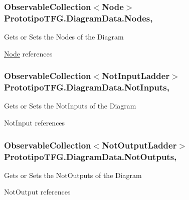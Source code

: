 \subsubsection[{Nodes}]{\setlength{\rightskip}{0pt plus 5cm}Observable\+Collection$<${\bf Node}$>$ Prototipo\+T\+F\+G.\+Diagram\+Data.\+Nodes\hspace{0.3cm}{\ttfamily [get]}, {\ttfamily [set]}}\label{class_prototipo_t_f_g_1_1_diagram_data_a38c2bb132b0998e9794dc8cd43e80784}


Gets or Sets the Nodes of the Diagram 

\hyperlink{class_prototipo_t_f_g_1_1_node}{Node} references\hypertarget{class_prototipo_t_f_g_1_1_diagram_data_a2822d1875199aa27bddc54e4ed7929d3}{}
\subsubsection[{Not\+Inputs}]{\setlength{\rightskip}{0pt plus 5cm}Observable\+Collection$<${\bf Not\+Input\+Ladder}$>$ Prototipo\+T\+F\+G.\+Diagram\+Data.\+Not\+Inputs\hspace{0.3cm}{\ttfamily [get]}, {\ttfamily [set]}}\label{class_prototipo_t_f_g_1_1_diagram_data_a2822d1875199aa27bddc54e4ed7929d3}


Gets or Sets the Not\+Inputs of the Diagram 

Not\+Input references\hypertarget{class_prototipo_t_f_g_1_1_diagram_data_af65586187f9255073987a87b8f15a6db}{}
\subsubsection[{Not\+Outputs}]{\setlength{\rightskip}{0pt plus 5cm}Observable\+Collection$<${\bf Not\+Output\+Ladder}$>$ Prototipo\+T\+F\+G.\+Diagram\+Data.\+Not\+Outputs\hspace{0.3cm}{\ttfamily [get]}, {\ttfamily [set]}}\label{class_prototipo_t_f_g_1_1_diagram_data_af65586187f9255073987a87b8f15a6db}


Gets or Sets the Not\+Outputs of the Diagram 

Not\+Output references\hypertarget{class_prototipo_t_f_g_1_1_diagram_data_ad071878319be0edcbc7f92c7e189a2ba}{}

